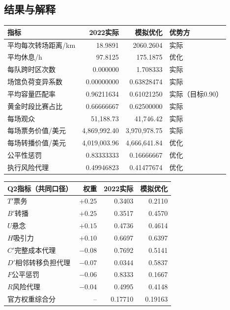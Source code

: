\documentclass[UTF8,11pt,a4paper]{ctexart}
\begin{document}
\subsection{结果与解释}
\begin{table}[H]\centering\scriptsize
\begin{tabular}{lrrl}
\toprule 指标 & 2022实际 & 模拟优化 & 优势方\\\midrule
平均每次转场距离/km & 18.9891 & 2060.2604 & 实际\\
平均休息/h & 97.8125 & 175.1875 & 优化\\
每队跨时区次数 & 0.000000 & 1.708333 & 实际\\
场馆负荷变异系数 & 0.00000000 & 0.63828474 & 实际\\
平均容量匹配率 & 0.96211634 & 0.61021250 & 实际（目标0.90）\\
黄金时段比赛占比 & 0.66666667 & 0.62500000 & 实际\\
每场观众 & 51,188.73 & 41,746.42 & 实际\\
每场票务价值/美元 & 4,869,992.40 & 3,970,978.75 & 实际\\
每场转播价值/美元 & 4,019,003.96 & 4,666,641.84 & 优化\\
公平性惩罚 & 0.83333333 & 0.16666667 & 优化\\
执行风险代理 & 0.49946823 & 0.41477674 & 优化\\
\bottomrule
\end{tabular}
\end{table}

\begin{table}[H]\centering\scriptsize
\begin{tabular}{lrrr}
\toprule Q2指标（共同口径） & 权重 & 2022实际 & 模拟优化\\\midrule
$T'$票务 & $+0.25$ & 0.3403 & 0.2110\\
$B'$转播 & $+0.25$ & 0.3517 & 0.4570\\
$U$悬念 & $+0.15$ & 0.4736 & 0.4614\\
$H$吸引力 & $+0.10$ & 0.6697 & 0.6397\\
$C'$完整成本代理 & $-0.08$ & 0.7692 & 0.5141\\
$D'$相邻转移负担代理 & $-0.07$ & 0.0344 & 0.5837\\
$F$公平惩罚 & $-0.06$ & 0.8333 & 0.1667\\
$R$风险代理 & $-0.04$ & 0.4995 & 0.4148\\\midrule
官方权重综合分 & -- & 0.17710 & 0.19163\\
\bottomrule
\end{tabular}
\end{table}
\end{document}
